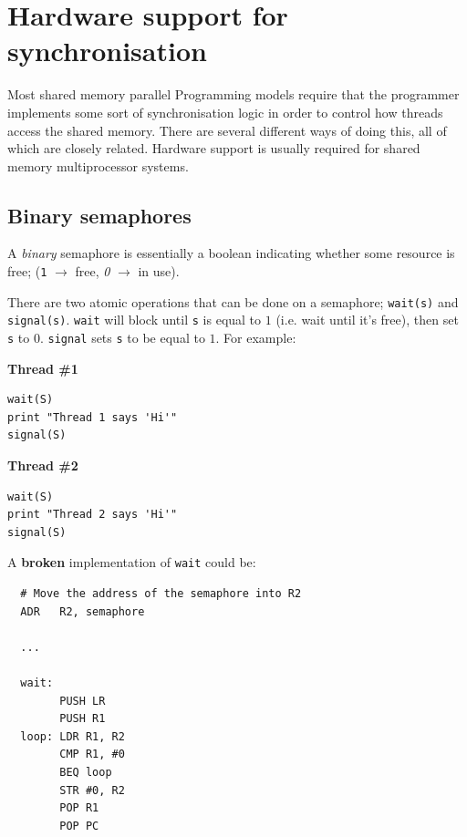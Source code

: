 
\section{Hardware support for synchronisation}

Most shared memory parallel Programming models require that the programmer
implements some sort of synchronisation logic in order to control how threads
access the shared memory. There are several different ways of doing this, all of
which are closely related. Hardware support is usually required for shared
memory multiprocessor systems.

\subsection{Binary semaphores}

A \textit{binary} semaphore is essentially a boolean indicating whether some
resource is free; (\texttt{1} $\rightarrow$ free, \textit{0} $\rightarrow$ in
use).

There are two atomic operations that can be done on a semaphore;
\texttt{wait(s)} and \texttt{signal(s)}. \texttt{wait} will block until
\texttt{s} is equal to $1$ (i.e. wait until it's free), then set \texttt{s} to
$0$. \texttt{signal} sets \texttt{s} to be equal to $1$. For example:

\begin{minipage}{0.5\textwidth}
\textbf{Thread \#1}
\begin{verbatim}
wait(S)
print "Thread 1 says 'Hi'"
signal(S)
\end{verbatim}
\end{minipage}
\begin{minipage}{0.5\textwidth}
\textbf{Thread \#2}
\begin{verbatim}
wait(S)
print "Thread 2 says 'Hi'"
signal(S)
\end{verbatim}
\end{minipage}

A \textbf{broken} implementation of \texttt{wait} could be:

\begin{verbatim}
  # Move the address of the semaphore into R2
  ADR   R2, semaphore

  ...

  wait:
        PUSH LR
        PUSH R1
  loop: LDR R1, R2
        CMP R1, #0
        BEQ loop
        STR #0, R2
        POP R1
        POP PC
\end{verbatim}

